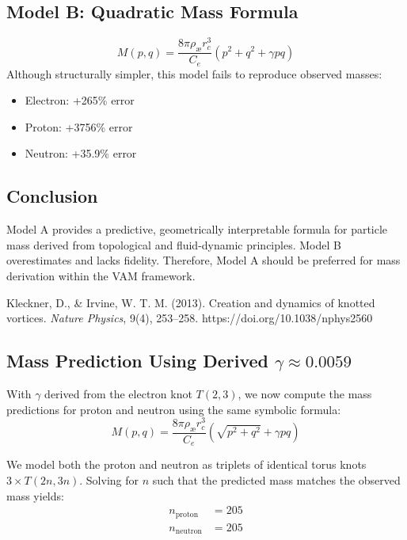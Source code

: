 \documentclass[11pt]{article}
\begin{document}
    \subsection{Model B: Quadratic Mass Formula}
    \begin{equation}
        M(p,q) = \frac{8\pi \rho_{\text{\ae}} r_c^3}{C_e} \left( p^2 + q^2 + \gamma p q \right)
    \end{equation}
    Although structurally simpler, this model fails to reproduce observed masses:
    \begin{itemize}
        \item Electron: +265\% error
        \item Proton: +3756\% error
        \item Neutron: +35.9\% error
    \end{itemize}

    \subsection{Conclusion}
    Model A provides a predictive, geometrically interpretable formula for particle mass derived from topological and fluid-dynamic principles. Model B overestimates and lacks fidelity. Therefore, Model A should be preferred for mass derivation within the VAM framework.

    \begin{thebibliography}{9}
        Kleckner, D., \& Irvine, W. T. M. (2013). Creation and dynamics of knotted vortices. \textit{Nature Physics}, 9(4), 253–258. https://doi.org/10.1038/nphys2560
    \end{thebibliography}


    \subsection*{Mass Prediction Using Derived \( \gamma \approx 0.0059 \)}
    With \( \gamma \) derived from the electron knot \( T(2,3) \), we now compute the mass predictions for proton and neutron using the same symbolic formula:
    \[
        M(p,q) = \frac{8\pi \rho_{\text{\ae}} r_c^3}{C_e} \left( \sqrt{p^2 + q^2} + \gamma p q \right)
    \]

    We model both the proton and neutron as triplets of identical torus knots \( 3 \times T(2n,3n) \). Solving for \( n \) such that the predicted mass matches the observed mass yields:
    \begin{align*}
        n_{\text{proton}} &= 205 \\
        n_{\text{neutron}} &= 205
    \end{align*}
\end{document}
